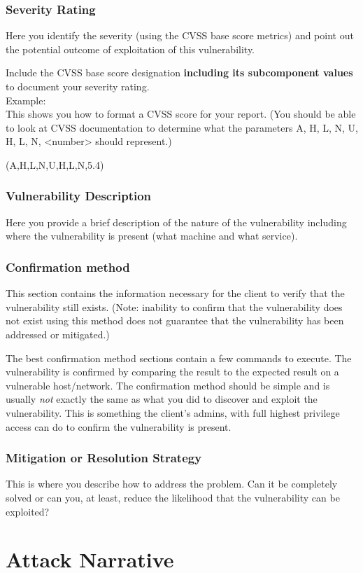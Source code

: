 	\subsubsection*{Severity Rating}
		Here you identify the severity (using the CVSS base score metrics)
		and point out the potential outcome of exploitation of this
		vulnerability.

		Include the CVSS base score designation \textbf{including its
		subcomponent values} to document your	severity rating.\\
		Example: \\
	   	This shows you how to format a CVSS score for your report.
	   	(You should be able to look at CVSS documentation to
	   	determine what the parameters A, H, L, N, U, H, L, N,
	   	<number> should represent.)
	   	
	    
		\cvss(A,H,L,N,U,H,L,N,5.4)
		
  	\subsubsection*{Vulnerability Description}
  		Here you provide a brief description of the nature of the vulnerability
  		including where the vulnerability is present (what machine and
  		what service).
  		
  	\subsubsection*{Confirmation method}
  	
		This section contains the information necessary for the
		client to verify that the vulnerability still exists.
		(Note: inability to confirm that the vulnerability
		does not exist using this method does not
		guarantee that the vulnerability has been addressed
		or mitigated.)
		
		The best confirmation method sections contain a few commands
		to execute. The vulnerability is confirmed by comparing
		the result to the expected result on a vulnerable
		host/network. The confirmation method should be simple
		and is usually \emph{not} exactly the same as what you
		did to discover and exploit the vulnerability.
		This is something the client's admins, with full
		highest privilege access can do to confirm the
		vulnerability is present.
		
    \subsubsection*{Mitigation or Resolution Strategy}
    
    	This is where you describe how to address the problem.
    	Can it be completely solved or can you, at least, reduce the
    	likelihood that the vulnerability can be exploited?
		



\section{Attack Narrative}
